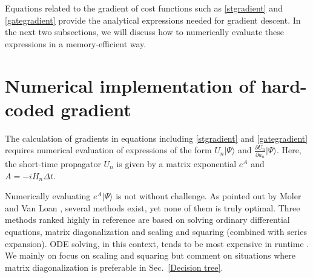 \documentclass[12pt]{article}
\newcommand{\dket}[1]{|#1\rangle}
\begin{document}
Equations related to the gradient of cost functions such as \eqref{stgradient} and \eqref{gategradient} provide the analytical expressions needed for gradient descent. In the next two subsections, we will discuss how to numerically evaluate these expressions in a memory-efficient way. 



\section{Numerical implementation of hard-coded gradient}
\label{implementation}

The calculation of gradients in equations including \eqref{stgradient} and \eqref{gategradient} requires numerical evaluation of expressions of the form $U_n\dket{\Psi}$  and $\frac{\partial U_n}{\partial a_n} \dket{\Psi}$. 
Here, the short-time propagator $U_n$ is given by a matrix exponential $e^A$ and $A=-iH_n\Delta t$. 

Numerically evaluating  $e^A\dket{\Psi}$ is not without challenge. As pointed out by Moler and Van Loan \cite{expmoler2003nineteen}, several methods exist, yet none of them is truly optimal. Three methods ranked highly in reference \cite{expmoler2003nineteen} are based on solving ordinary differential equations, matrix diagonalization and scaling and squaring (combined with series expansion). ODE solving, in this context, tends to be most expensive in runtime \cite{semiadgoerz2022quantum}. We mainly on focus on scaling and squaring but comment on situations where matrix diagonalization is preferable in Sec.\ \ref{Decision tree}. 
\end{document}
